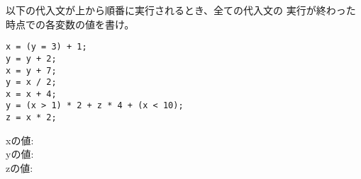 \documentclass[a4j]{jarticle}
\begin{document}
\begin{multicols*}{2}
以下の代入文が上から順番に実行されるとき、全ての代入文の
実行が終わった時点での各変数の値を書け。

\begin{verbatim}
x = (y = 3) + 1;
y = y + 2;
x = y + 7;
y = x / 2;
x = x + 4;
y = (x > 1) * 2 + z * 4 + (x < 10);
z = x * 2;
\end{verbatim}


{\ttfamily x}の値:\\

{\ttfamily y}の値:\\

{\ttfamily z}の値:\\






\vfill




\end{multicols*}
\end{document}
